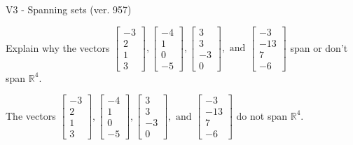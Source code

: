 \begin{exercise}
  \begin{exerciseTitle}V3 - Spanning sets (ver. 957)\end{exerciseTitle}
  \begin{exerciseStatement}
    Explain why the vectors \(\left[\begin{array}{r}
-3 \\
2 \\
1 \\
3
\end{array}\right] , \left[\begin{array}{r}
-4 \\
1 \\
0 \\
-5
\end{array}\right] , \left[\begin{array}{r}
3 \\
3 \\
-3 \\
0
\end{array}\right] , \text{ and } \left[\begin{array}{r}
-3 \\
-13 \\
7 \\
-6
\end{array}\right]\) span or don't span \(\mathbb{R}^4\). 
	


  \end{exerciseStatement}
  \begin{exerciseAnswer}
   The vectors \(\left[\begin{array}{r}
-3 \\
2 \\
1 \\
3
\end{array}\right] , \left[\begin{array}{r}
-4 \\
1 \\
0 \\
-5
\end{array}\right] , \left[\begin{array}{r}
3 \\
3 \\
-3 \\
0
\end{array}\right] , \text{ and } \left[\begin{array}{r}
-3 \\
-13 \\
7 \\
-6
\end{array}\right]\) 
  	 do not  
	span \(\mathbb{R}^4\).
  


  \end{exerciseAnswer}
\end{exercise}